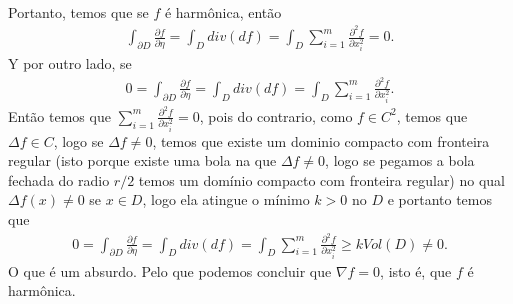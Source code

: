 \begin{homeworkProblem}[Seção 2-12]
\begin{solution}
\begin{align*}
    \end{align*}
    Portanto, temos que se $f$ é harmônica, então
    \begin{align*}
      \int_{\partial D}\frac{\partial f}{\partial \eta}=\int_{D}div(df)=\int_{D}\sum_{i=1}^{m}\frac{\partial^{2}f }{\partial x_i^{2}}=0.
    \end{align*}
    Y por outro lado, se 
    \begin{align*}
      0=\int_{\partial D}\frac{\partial f}{\partial \eta}=\int_{D}div(df)=\int_{D}\sum_{i=1}^{m}\frac{\partial^{2}f }{\partial x_i^{2}}.
    \end{align*}
    Então temos que $\sum_{i=1}^{m}\frac{\partial^{2}f }{\partial x_i^{2}}=0$, pois do contrario, como $f\in C^{2}$, temos que $\Delta f\in C$, logo se $\Delta f\neq 0$, temos que existe um dominio compacto com fronteira regular (isto porque existe uma bola na que $\Delta f\neq 0$, logo se pegamos a bola fechada do radio $r/2$ temos um domínio compacto com fronteira regular) no qual $\Delta f(x)\neq 0$ se $x\in D$, logo ela atingue o mínimo $k>0$ no $D$ e portanto temos que 
    \begin{align*}
      0=\int_{\partial D}\frac{\partial f}{\partial \eta}=\int_{D}div(df)=\int_{D}\sum_{i=1}^{m}\frac{\partial^{2}f }{\partial x_i^{2}}\geq k Vol(D)\neq 0.      
    \end{align*}
    O que é um absurdo. Pelo que podemos concluir que $\nabla f=0$, isto é, que $f$ é harmônica. 
  \end{solution}
\end{homeworkProblem}
